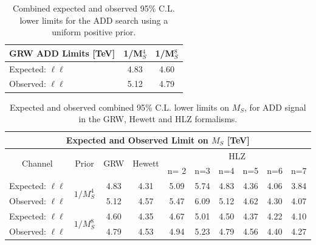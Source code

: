 \begin{table}[p]
\centering
\begin{tabular}{ l | c | c }
    \hline
    \hline
    GRW ADD Limits [TeV] & 1/M$_S^4$ & 1/M$_S^8$ \\
    \hline
    Expected: $\ell\ell$ & 4.83 & 4.60 \\
    Observed: $\ell\ell$ & 5.12 & 4.79 \\
    \hline
    \hline
\end{tabular}
\caption{Combined expected and observed 95\% C.L. lower limits for the ADD search using a uniform positive prior.}
\label{tab:Comb_Limits_ADD}
\end{table}




\begin{table}[]
  \begin{center}
    \begin{tabular}{c|c|c|c|cccccc}
        \hline
        \hline
        \multicolumn{10}{c}{Expected and Observed Limit on $M_{S}$ [TeV]} \\
        \hline
        \multirow{2}{*}{Channel} & \multirow{2}{*}{Prior} & \multirow{2}{*}{GRW} & \multirow{2}{*}{Hewett} & \multicolumn{6}{c}{HLZ} \\
        \cline{5-10}
                &       &     &        & n= 2 &  n=3 & n=4 & n=5 & n=6 & n=7 \\
        \hline
        \hline
        Expected: $\ell\ell$      & \multirow{2}{*}{$1/M_{S}^{4}$} & 4.83 & 4.31 & 5.09 & 5.74 & 4.83 & 4.36 & 4.06 & 3.84 \\
        Observed: $\ell\ell$      &  & 5.12 & 4.57 & 5.47 & 6.09 & 5.12 & 4.62 & 4.30 & 4.07 \\
        \hline
        Expected: $\ell\ell$      & \multirow{2}{*}{$1/M_{S}^{8}$} & 4.60 & 4.35 & 4.67 & 5.01 & 4.50 & 4.37 & 4.22 & 4.10 \\
        Observed: $\ell\ell$      &  & 4.79 & 4.53 & 4.94 & 5.23 & 4.79 & 4.56 & 4.40 & 4.27 \\
        \hline
        \hline
    \end{tabular}
  \end{center}
    \caption{Expected and observed combined 95\% C.L. lower limits on $M_{S}$, for ADD signal in the GRW, Hewett and HLZ formalisms.
    \label{tab:ADD_results_formalisms_comb}}
\end{table}



